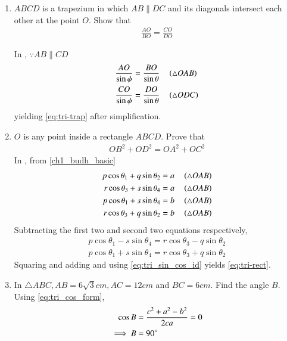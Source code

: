 \begin{enumerate}[label=\thesubsection.\arabic*.,ref=\thesubsection.\theenumi]
\item $ABCD$ is a trapezium in which $AB  \parallel  DC$ and its diagonals intersect each other at the point $O$. Show
that
\begin{align}
	\label{eq:tri-trap}	
\frac{AO}{ BO}=\frac{CO}{  DO}
\end{align}
\begin{figure}[H]
	\begin{center}
			\resizebox{0.6\columnwidth}{!}{}
	\end{center}
	\caption{}
	\label{fig:tri-trap}	
\end{figure}
\solution 
	In , $\because AB \parallel CD$	
\begin{align}
	\frac{AO}{\sin \phi} &= \frac{BO}{\sin \theta} \quad \left(\triangle OAB\right)
	\\
	\frac{CO}{\sin \phi} &= \frac{DO}{\sin \theta} \quad \left(\triangle ODC\right)
\end{align}
yielding
	\eqref{eq:tri-trap}	
	after simplification.
\item $O$ is any point inside a rectangle $ABCD$. Prove that 
\begin{align}
	OB^2+OD^2 = OA^2+OC^2
	\label{eq:tri-rect}	
\end{align}
	\solution
	In 
	,	
from \eqref{ch1_budh_basic}
\begin{align}
	p \cos \theta_1+q \sin \theta_2 = a \quad \left(\triangle OAB\right)
	\\
	r \cos \theta_3+s \sin \theta_4 = a \quad \left(\triangle OAB\right)
	\\
	p \cos \theta_1+s \sin \theta_4 = b \quad \left(\triangle OAB\right)
	\\
	r \cos \theta_3+q \sin \theta_2 = b \quad \left(\triangle OAB\right)
\end{align}
Subtracting the first two and second two equations respectively,
\begin{align}
	p \cos \theta_1 
	-s \sin \theta_4  
= r \cos \theta_3-q \sin \theta_2
\\
	p \cos \theta_1+s \sin \theta_4 = 
	r \cos \theta_3+q \sin \theta_2  
\end{align}
Squaring and adding and using 
\eqref{eq:tri_sin_cos_id}
yields
	\eqref{eq:tri-rect}.	
\begin{figure}[H]
	\begin{center}
			\resizebox{0.6\columnwidth}{!}{}
	\end{center}
	\caption{}
	\label{fig:tri-rect}	
\end{figure}
\item  In  $\triangle  ABC, AB = 6\sqrt{3} cm, AC = 12 cm$ and $BC = 6 cm$. Find the angle $B$.
	\\
	\solution Using 
\eqref{eq:tri_cos_form},
\begin{align}
	\cos B &= 
 \frac{c^2+a^2-b^2}{2ca}=0
	\\
	\implies B &= 90\degree
\end{align}
\end{enumerate}
